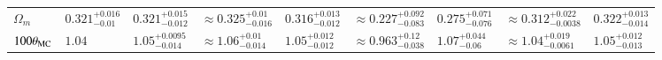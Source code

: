 \begin{landscape}
\begin{table}
\begin{center}
\begin{tabular}{lllllllll}
$\Omega_m$& $0.321^{+0.016}_{-0.01}$ & $0.321^{+0.015}_{-0.012}$& $\approx 0.325^{+0.01}_{-0.016}$ & $0.316^{+0.013}_{-0.012}$& $\approx 0.227^{+0.092}_{-0.083}$ & $0.275^{+0.071}_{-0.076}$& $\approx 0.312^{+0.022}_{-0.0038}$ & $0.322^{+0.013}_{-0.014}$\\
$100\theta_{\rm MC}$& $1.04$ & $1.05^{+0.0095}_{-0.014}$& $\approx 1.06^{+0.01}_{-0.014}$ & $1.05^{+0.012}_{-0.012}$& $\approx 0.963^{+0.12}_{-0.038}$ & $1.07^{+0.044}_{-0.06}$& $\approx 1.04^{+0.019}_{-0.0061}$ & $1.05^{+0.012}_{-0.013}$\\
    \bottomrule
\end{tabular}
\end{center}
\end{table}
\end{landscape}
